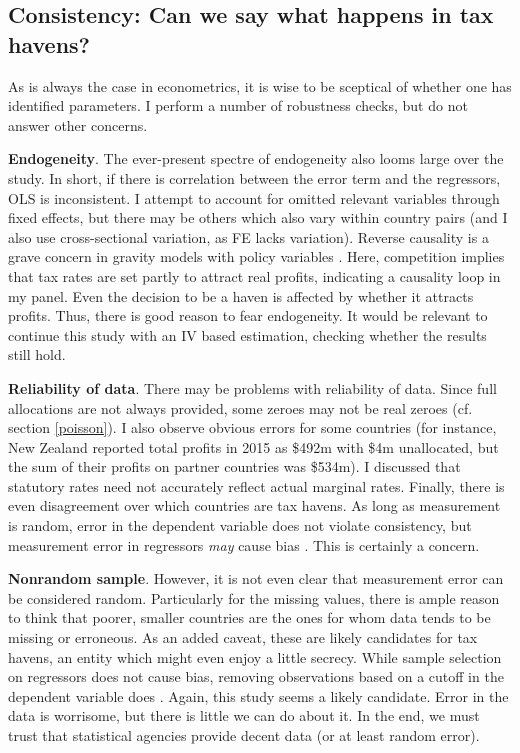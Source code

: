 \documentclass[twoside,a4paper,11pt]{article}
\begin{document}
\subsection{Consistency: Can we say what happens in tax havens? }\label{dissconsistency}
As is always the case in econometrics, it is wise to be sceptical of whether one has identified parameters. I perform a number of robustness checks, but do not answer other concerns. 

\textbf{Endogeneity}. The ever-present spectre of endogeneity also looms large over the study. In short, if there is correlation between the error term and the regressors, OLS is inconsistent. I attempt to account for omitted relevant variables through fixed effects, but there may be others which also vary within country pairs (and I also use cross-sectional variation, as FE lacks variation). Reverse causality is a grave concern in gravity models with policy variables \autocite[41]{shepherd_gravity_2012}. Here, competition implies that tax rates are set partly to attract real profits, indicating a causality loop in my panel. Even the decision to be a haven is affected by whether it attracts profits. Thus, there is good reason to fear endogeneity. It would be relevant to continue this study with an IV based estimation, checking whether the results still hold.

\textbf{Reliability of data}. There may be problems with reliability of data. Since full allocations are not always provided, some zeroes may not be real zeroes (cf. section \ref{poisson}). I also observe obvious errors for some countries (for instance, New Zealand reported total profits in 2015 as \$492m with \$4m unallocated, but the sum of their profits on partner countries was  \$534m). I discussed that statutory rates need not accurately reflect actual marginal rates. Finally, there is even disagreement over which countries are tax havens. As long as measurement is random, error in the dependent variable does not violate consistency, but measurement error in regressors \textit{may} cause bias \autocite[307-313]{wooldridge_introductory_2009}. This is certainly a concern.

\textbf{Nonrandom sample}. However, it is not even clear that measurement error can be considered random. Particularly for the missing values, there is ample reason to think that poorer, smaller countries are the ones for whom data tends to be missing or erroneous. As an added caveat, these are likely candidates for tax havens, an entity which might even enjoy a little secrecy. While sample  selection on regressors does not cause bias, removing observations based on a cutoff in the dependent variable does \autocite[315]{wooldridge_introductory_2009}. Again, this study seems a likely candidate. Error in the data is worrisome, but there is little we can do about it. In the end, we must trust that statistical agencies provide decent data (or at least random error).
\end{document}
